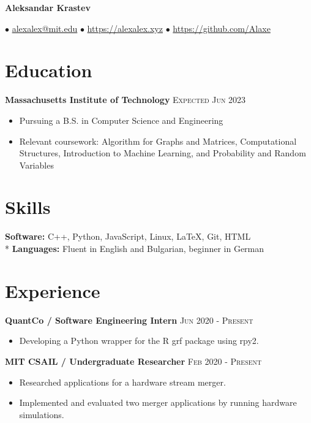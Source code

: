 \documentclass[letterpaper,11pt]{article}
\author{Aleksandar Krastev}
\date{2019-09-03}
\newcommand{\noskip}{\vspace{-\parskip}}
\begin{document}
\setlength{\belowdisplayskip}{\parskip}
\setlength{\belowdisplayshortskip}{\belowdisplayskip}
\setlength{\abovedisplayskip}{\parskip}
\setlength{\abovedisplayshortskip}{\abovedisplayskip}


\centerline{{\Huge \bf Aleksandar Krastev}}
$\bullet$ \href{mailto:alexalex@mit.edu}{alexalex@mit.edu} \hfill
$\bullet$ \href{https://alexalex.xyz}{https://alexalex.xyz} \hfill
$\bullet$ \href{https://github.com/Alaxe}{https://github.com/Alaxe} \hfill

\noskip
\section*{Education}
\textbf{Massachusetts Institute of Technology}
\hfill
\textsc{Expected Jun 2023}

\noskip
\begin{itemize}
    \item Pursuing a B.S. in Computer Science and Engineering
    \item Relevant coursework:
        Algorithm for Graphs and Matrices,
        Computational Structures,
        Introduction to Machine Learning,
        and Probability and Random Variables
\end{itemize}

\section*{Skills}
\textbf{Software:} C++, Python, JavaScript, Linux, LaTeX, Git, HTML\\*
\textbf{Languages:} Fluent in English and Bulgarian, beginner in German

\section*{Experience}
\textbf{QuantCo / Software Engineering Intern}
\hfill
\textsc{Jun 2020 - Present}%
\noskip
\begin{itemize}
    \item Developing a Python wrapper for the R grf package using rpy2.
\end{itemize}

\textbf{MIT CSAIL / Undergraduate Researcher}
\hfill
\textsc{Feb 2020 - Present}%
\noskip
\begin{itemize}
    \item Researched applications for a hardware stream merger.
    \item Implemented and evaluated two merger applications by running hardware
        simulations.
\end{itemize}
\end{document}
